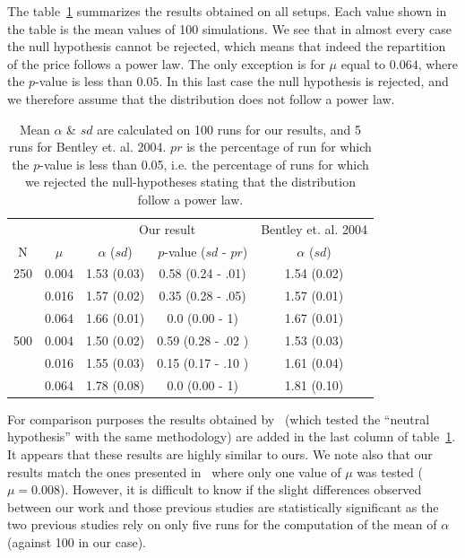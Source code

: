 \documentclass[a4paper]{article}
\begin{document}
The table~\ref{tab:mualpha} summarizes the results obtained on all setups. Each value shown in the table is the mean values of 100 simulations. We see that in almost every case the null hypothesis cannot be rejected, which means that indeed the repartition of the price follows a power law. The only exception is for $\mu$ equal to $0.064$, where the $p$-value is less than $0.05$. In this last case the null hypothesis is rejected, and we therefore assume that the distribution does not follow a power law.

\begin{table}[!h]
	\caption{Mean $\alpha$ \& $sd$ are calculated on 100 runs for our results, and 5 runs for Bentley et. al. 2004. $pr$ is the percentage of run for which the $p$-value is less than 0.05, i.e. the percentage of runs for which we rejected the null-hypotheses stating that the distribution follow a power law.}
	\centering
	\begin{tabular}{cc|ccc}
		\multicolumn{2}{r}{}&\multicolumn{2}{c}{Our result}&\multicolumn{1}{c}{Bentley et. al. 2004}\\
			N&$\mu$ & $\alpha$ ($sd$) & $p$-value ($sd$ - $pr$) &$\alpha$ ($sd$)\\\hline
		250	&0.004&1.53 (0.03)&0.58 (0.24 - .01)&1.54 (0.02)\\
			&0.016&1.57 (0.02)&0.35 (0.28 - .05)&1.57 (0.01)\\
			&0.064&1.66 (0.01)&0.0 (0.00 - 1)&1.67 (0.01)\\\hline
		500	&0.004&1.50 (0.02)&0.59 (0.28 - .02 )&1.53 (0.03)\\
			&0.016&1.55 (0.03)&0.15 (0.17 - .10 )&1.61 (0.04)\\
			&0.064&1.78 (0.08)&0.0 (0.00 - 1)&1.81 (0.10)\\
	\end{tabular}
	\label{tab:mualpha}
\end{table}

For comparison purposes the results obtained by~\cite{bentley_random_2004} (which tested the ``neutral hypothesis'' with the same methodology) are added in the last column of table~\ref{tab:mualpha}. It appears that these results are highly similar to ours. We note also that our results match the ones presented in~\cite{mesoudi_random_2009} where only one value of $\mu$ was tested ($\mu = 0.008$). However, it is difficult to know if the slight differences observed between our work and those previous studies are statistically significant as the two previous studies rely on only five runs for the computation of the mean of $\alpha$ (against 100 in our case).
\end{document}
